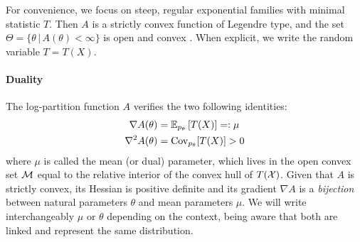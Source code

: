 \documentclass[twoside]{article}
\newcommand*{\expect}[2][]{\ensuremath{\mathbb{E}_{#1} \left[ #2 \right] }} %
\newcommand{\cond}{\,\vert\,}
\newcommand{\logpart}{A}
\newcommand{\nat}{\theta}
\newcommand{\m}{\mu}
\newcommand{\meanp}{\m}
\begin{document}
For convenience, we focus on steep, regular exponential families with minimal statistic $T$.
Then $\logpart$ is a strictly convex function of Legendre type,
and the set $\Theta = \{ \nat \cond \logpart(\nat) < \infty\}$ is open and convex
\citep{barndoffnielsen2014information}.
When explicit, we write the random variable $T = T(X)$.


\paragraph{Duality}
The log-partition function $\logpart$ verifies the two following identities:
\begin{align}
    \nabla\logpart(\nat) &=  \expect[p_\nat]{T(X)} =: \meanp \\
    \nabla^2 \logpart(\nat) &= \Cov_{p_\nat}[T(X)] > 0
\end{align}
where $\meanp$ is called the mean (or dual) parameter, which lives in the open convex set ${\mathcal M}$ equal to the relative interior of the convex hull of $T({\mathcal X})$.
Given that $\logpart$ is strictly convex, its Hessian is positive definite and its gradient $\nabla \logpart$ is a \textit{bijection} between natural parameters $\nat$ and mean parameters $\m$.
We will write interchangeably $\m$ or  $\nat$ depending on the context, being aware that both are linked and represent the same distribution.
\end{document}
